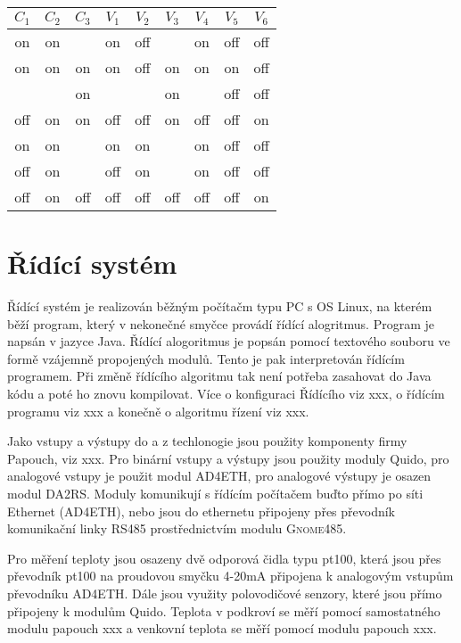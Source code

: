 \documentclass[a4paper,draft]{book}
\begin{document}
\begin{table}
      \centering
      \begin{tabular}{ccccccccc}
        $C_1$ & $C_2$ & $C_3$ & $V_1$ & $V_2$ & $V_3$ & $V_4$ & $V_5$ & $V_6$\\
        \hline
        on    & on    &       & on    & off   &       & on    & off   & off\\
        on    & on    & on    & on    & off   & on    & on    & on    & off\\
              &       & on    &       &       & on    &       & off   & off\\
        off   & on    & on    & off   & off   & on    & off   & off   & on\\
        on    & on    &       & on    & on    &       & on    & off   & off\\
        off   & on    &       & off   & on    &       & on    & off   & off\\
        off   & on    & off   & off   & off   & off   & off   & off   & on
      \end{tabular}
\end{table}

\chapter{Řídící systém}\label{chap:control}

    Řídící systém je realizován běžným počítačm typu PC s OS Linux, na kterém
    běží program, který v nekonečné smyčce provádí řídící alogritmus. Program
    je napsán v jazyce Java. Řídící alogoritmus je popsán pomocí textového
    souboru ve formě vzájemně propojených modulů. Tento je pak interpretován
    řídícím programem. Při změně řídícího algoritmu tak není potřeba zasahovat
    do Java kódu a poté ho znovu kompilovat. Více o konfiguraci Řídícího
    viz xxx, o řídícím programu viz xxx a konečně o algoritmu řízení viz xxx.

    Jako vstupy a výstupy do a z techlonogie jsou použity komponenty firmy
    Papouch, viz xxx. Pro binární vstupy a výstupy jsou použity moduly Quido,
    pro analogové vstupy je použit modul AD4ETH, pro analogové výstupy je
    osazen modul DA2RS. Moduly komunikují s řídícím počítačem buďto přímo
    po síti Ethernet (AD4ETH), nebo jsou do ethernetu připojeny přes převodník
    komunikační linky RS485 prostřednictvím modulu \textsc{Gnome485}.

    Pro měření teploty jsou osazeny dvě odporová čidla typu pt100, která jsou
    přes převodník pt100 na proudovou smyčku 4-20mA připojena k analogovým
    vstupům převodníku AD4ETH. Dále jsou využity polovodičové senzory, které
    jsou přímo připojeny k modulům Quido. Teplota v podkroví se měří pomocí
    samostatného modulu papouch xxx a venkovní teplota se měří pomocí modulu
    papouch xxx.
\end{document}
